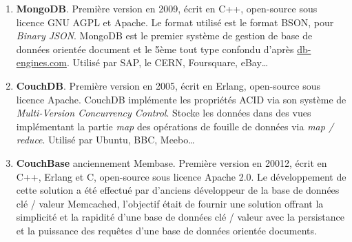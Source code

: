 	\begin{enumerate}
		\item \textbf{MongoDB}. Première version en 2009, écrit en C++, open-source sous licence GNU AGPL et Apache. Le format utilisé est le format BSON, pour \textit{Binary JSON}. MongoDB est le premier système de gestion de base de données orientée document et le 5ème tout type confondu d'après \url{db-engines.com}. Utilisé par SAP, le CERN, Foursquare, eBay\dots\cite{Wikipedia_mongodb}
		\item \textbf{CouchDB}. Première version en 2005, écrit en Erlang, open-source sous licence Apache. CouchDB implémente les propriétés ACID via son système de \textit{Multi-Version Concurrency Control}. Stocke les données dans des vues implémentant la partie \textit{map} des opérations de fouille de données via \textit{map / reduce}. Utilisé par Ubuntu, BBC, Meebo\dots\cite{Wikipedia_couchdb}
		\item \textbf{CouchBase} anciennement Membase. Première version en 20012, écrit en C++, Erlang et C, open-source sous licence Apache 2.0. Le développement de cette solution a été effectué par d'anciens développeur de la base de données clé / valeur Memcached, l'objectif était de fournir une solution offrant la simplicité et la rapidité d'une base de données clé / valeur avec la persistance et la puissance des requêtes d'une base de données orientée documents.\cite{Wikipedia_couchbase}
	\end{enumerate}
